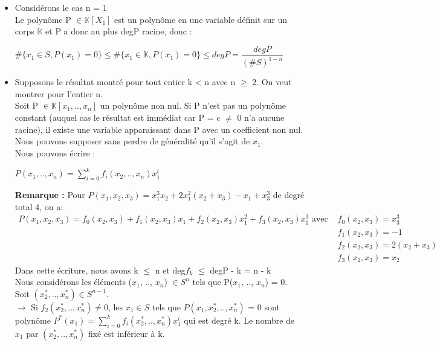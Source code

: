 \documentclass[12pt,a4paper]{article}
\begin{document}
\begin{itemize}
	\item  Considérons le cas n = 1\\
	Le polynôme P $\in \mathbb{K}[X_1]$ est un polynôme en une variable définit sur un corps $\mathbb{K}$ et P a donc au plus degP racine, donc :
	\begin{center}
		$\#\{x_1 \in S, P(x_1) = 0\} \leq \#\{x_1 \in \mathbb{K}, P(x_1) = 0\} \leq degP = \dfrac{degP}{(\#S)^{1 - n}}$
	\end{center}
	\item Supposons le résultat montré pour tout entier k < n avec n $\geq$ 2. On veut montrer pour l'entier n.\\
	Soit P $\in \mathbb{K}[x_1, .., x_n]$ un polynôme non nul. Si P n'est pas un polynôme constant (auquel cas le résultat est immédiat car P = c $\neq$ 0 n'a aucune racine), il existe une variable apparaissant dans P avec un coefficient non nul. Nous pouvons supposer sans perdre de généralité qu'il s'agit de $x_1$.\\
	Nous pouvons écrire :
	\begin{center}
		$P(x_1, .., x_n) = \sum\limits_{i = 0}^{k} f_i(x_2, .., x_n)x_1^i$
	\end{center}
	\textbf{Remarque :} Pour $P(x_1,x_2,x_3) = x_1^3x_2 + 2x_1^2(x_2 + x_3) - x_1 + x_3^3$ de degré total 4, on a:
	\begin{equation}
	\begin{split}\nonumber
	P(x_1, x_2, x_3) = f_0(x_2, x_3) + f_1(x_2, x_3)x_1 + f_2(x_2, x_3)x_1^2 + f_3(x_2, x_3)x_1^3 \text{ avec } & f_0(x_2, x_3) = x_3^3\\
	& f_1(x_2, x_3) = -1\\
	& f_2(x_2, x_3) = 2(x_2 + x_3)\\
	& f_3(x_2, x_3) = x_2
	\end{split}
	\end{equation}
	Dans cette écriture, nous avons k $\leq$ n et deg$f_k$ $\leq$ degP - k = n - k\\
	Nous considérons les éléments ($x_1$, .., $x_n$) $\in S^n$ tels que P($x_1$, .., $x_n$) = 0.\\
	Soit $(x_2^*, .., x_n^*) \in S^{n - 1}$.\\
	$\rightarrow$ Si $f_2(x_2^*, .., x_n^*) \neq 0$, les $x_1 \in S$ tels que $P(x_1, x_2^*, .., x_n^*)$ = 0 sont polynôme $P^*(x_1) = \sum\limits_{i = 0}^{k} f_i(x_2^*, .., x_n^*)x_1^i$ qui est degré k. Le nombre de $x_1$ par $(x_2^*, .., x_n^*)$ fixé est inférieur à k.\\

\end{itemize}
\end{document}
